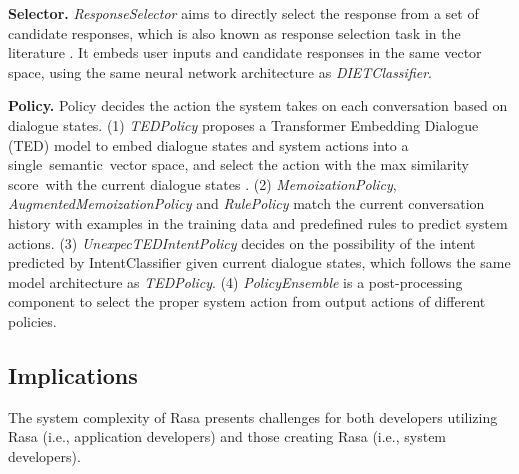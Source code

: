 \textbf{Selector.} \textit{ResponseSelector} aims to directly select the response from a set of candidate responses, which is also known as response selection task in the literature \cite{chaudhuri-etal-2018-improving}. It embeds user inputs and candidate responses in the same vector space, using the same neural network architecture as \textit{DIETClassifier}.

\textbf{Policy.} Policy decides the action the system takes on each conversation based on dialogue states.
(1) \textit{TEDPolicy} proposes a Transformer Embedding Dialogue (TED) model to embed dialogue states and system actions into a single~semantic~vector space, and select the action with the max similarity score~with the current dialogue states \cite{TED}.
(2) \textit{MemoizationPolicy}, \textit{AugmentedMemoizationPolicy} and \textit{RulePolicy} match the current conversation history with examples in the training data and predefined rules to predict system actions.
(3) \textit{UnexpecTEDIntentPolicy} decides on the possibility of the intent predicted by IntentClassifier given current dialogue states, which follows the same model architecture as \textit{TEDPolicy}.
(4) \textit{PolicyEnsemble} is a post-processing component to select the proper system action from output actions of different policies. 


\subsection{Implications}

The system complexity of Rasa presents challenges for both developers utilizing Rasa (i.e., application developers) and those creating Rasa (i.e., system developers).


